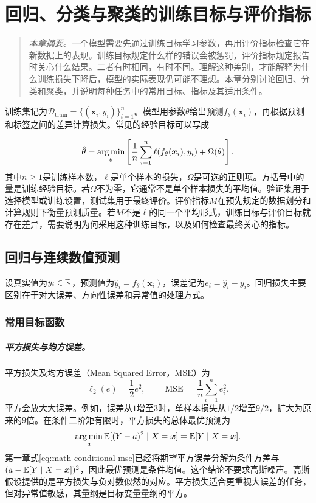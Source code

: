 \chapter{回归、分类与聚类的训练目标与评价指标}
\label{chap:objectives-metrics}
\begin{quote}\small
\textit{本章摘要。}一个模型需要先通过训练目标学习参数，再用评价指标检查它在新数据上的表现。训练目标规定什么样的错误会被惩罚，评价指标规定报告时关心什么结果。二者有时相同，有时不同。理解这种差别，才能解释为什么训练损失下降后，模型的实际表现仍可能不理想。本章分别讨论回归、分类和聚类，并说明每种任务中的常用目标、指标及其适用条件。
\end{quote}

训练集记为$\mathcal D_{\mathrm{train}}=\{(\bm x_i,y_i)\}_{i=1}^n$。模型用参数$\theta$给出预测$f_\theta(\bm x_i)$，再根据预测和标签之间的差异计算损失。常见的经验目标可以写成

\begin{equation}
 \hat{\theta}=\mathop{\mathrm{arg\,min}}_{\theta}\left[\frac1n\sum_{i=1}^n\ell(f_\theta(\bm x_i),y_i)+\Omega(\theta)\right].
 \label{eq:pipeline-general-objective}
\end{equation}
其中$n\geq1$是训练样本数，$\ell$是单个样本的损失，$\Omega$是可选的正则项。方括号中的量是训练经验目标。若$\Omega$不为零，它通常不是单个样本损失的平均值。验证集用于选择模型或训练设置，测试集用于最终评价。评价指标$M$在预先规定的数据划分和计算规则下衡量预测质量。若$M$不是$\ell$的同一个平均形式，训练目标与评价目标就存在差异，需要说明为何采用这种训练目标，以及如何检查最终关心的指标。

\section{回归与连续数值预测}
设真实值为$y_i\in\mathbb{R}$，预测值为$\hat y_i=f_\theta(\bm x_i)$，误差记为$e_i=\hat y_i-y_i$。回归损失主要区别在于对大误差、方向性误差和异常值的处理方式。

\subsection{常用目标函数}
\paragraph{平方损失与均方误差。}
平方损失及均方误差（Mean Squared Error，MSE）为
\begin{equation}
 \ell_2(e)=\frac12e^2,\qquad
 \operatorname{MSE}=\frac1n\sum_{i=1}^ne_i^2.
 \label{eq:regression-mse}
\end{equation}
平方会放大大误差。例如，误差从$1$增至$3$时，单样本损失从$1/2$增至$9/2$，扩大为原来的$9$倍。在条件二阶矩有限时，平方损失的总体最优预测为
\begin{equation}
 \mathop{\mathrm{arg\,min}}_a\mathbb E[(Y-a)^2\mid X=\bm x]=\mathbb E[Y\mid X=\bm x].
 \label{eq:regression-conditional-mean}
\end{equation}
第一章式\eqref{eq:math-conditional-mse}已经将期望平方误差分解为条件方差与$(a-\mathbb{E}[Y\mid X=\bm x])^2$，因此最优预测是条件均值。这个结论不要求高斯噪声。高斯假设提供的是平方损失与负对数似然的对应。平方损失适合更重视大误差的任务，但对异常值敏感，其量纲是目标变量量纲的平方。

